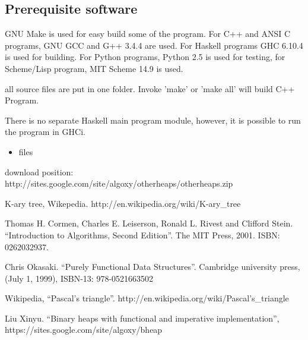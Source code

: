 \documentclass{article}
\begin{document}
\subsection{Prerequisite software}
GNU Make is used for easy build some of the program. For C++ and ANSI C programs,
GNU GCC and G++ 3.4.4 are used. 
For Haskell programs GHC 6.10.4 is used
for building. For Python programs, Python 2.5 is used for testing, for
Scheme/Lisp program, MIT Scheme 14.9 is used.

all source files are put in one folder. Invoke 'make' or 'make all'
will build C++ Program. 

There is no separate Haskell main program module, however, it is possible to run the program in GHCi.

\begin{itemize}
\item files

\end{itemize}

download position: http://sites.google.com/site/algoxy/otherheaps/otherheaps.zip

\begin{thebibliography}{99}

K-ary tree, Wikepedia. http://en.wikipedia.org/wiki/K-ary\_tree

Thomas H. Cormen, Charles E. Leiserson, Ronald L. Rivest and Clifford Stein. ``Introduction to Algorithms, Second Edition''. The MIT Press, 2001. ISBN: 0262032937.

Chris Okasaki. ``Purely Functional Data Structures''. Cambridge university press, (July 1, 1999), ISBN-13: 978-0521663502

Wikipedia, ``Pascal's triangle''. http://en.wikipedia.org/wiki/Pascal's\_triangle

Liu Xinyu. ``Binary heaps with functional and imperative implementation'', https://sites.google.com/site/algoxy/bheap

\end{thebibliography}

\ifx\wholebook\relax \else
\end{document}
